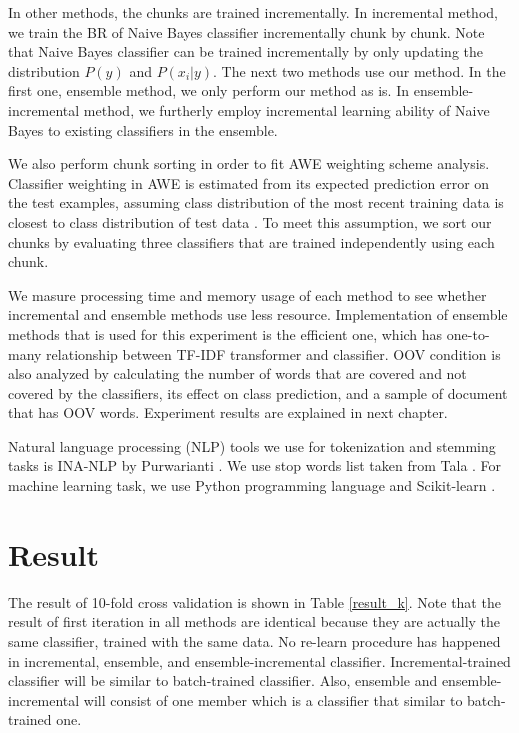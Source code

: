 \documentclass[conference]{IEEEtran}
\begin{document}
In other methods, the chunks are trained incrementally.
In incremental method, we train the BR of Naive Bayes classifier incrementally chunk by chunk.
Note that Naive Bayes classifier can be trained incrementally by only updating the distribution $P(y)$ and $P(x_i|y)$.
The next two methods use our method.
In the first one, ensemble method, we only perform our method as is.
In ensemble-incremental method, we furtherly employ incremental learning ability of Naive Bayes to existing classifiers in the ensemble.

We also perform chunk sorting in order to fit AWE weighting scheme analysis.
Classifier weighting in AWE is estimated from its expected prediction error on the test examples, assuming class distribution of the most recent training data is closest to class distribution of test data \cite{wang}.
To meet this assumption, we sort our chunks by evaluating three classifiers that are trained independently using each chunk.

We masure processing time and memory usage of each method to see whether incremental and ensemble methods use less resource.
Implementation of ensemble methods that is used for this experiment is the efficient one, which has one-to-many relationship between TF-IDF transformer and classifier.
OOV condition is also analyzed by calculating the number of words that are covered and not covered by the classifiers, its effect on class prediction, and a sample of document that has OOV words.
Experiment results are explained in next chapter.

Natural language processing (NLP) tools we use for tokenization and stemming tasks is INA-NLP by Purwarianti \cite{ayu}.
We use stop words list taken from Tala \cite{tala}.
For machine learning task, we use Python programming language and Scikit-learn \cite{sklearn}.

\section{Result}

The result of 10-fold cross validation is shown in Table \ref{result_k}.
Note that the result of first iteration in all methods are identical because they are actually the same classifier, trained with the same data.
No re-learn procedure has happened in incremental, ensemble, and ensemble-incremental classifier.
Incremental-trained classifier will be similar to batch-trained classifier.
Also, ensemble and ensemble-incremental will consist of one member which is a classifier that similar to batch-trained one.
\end{document}
